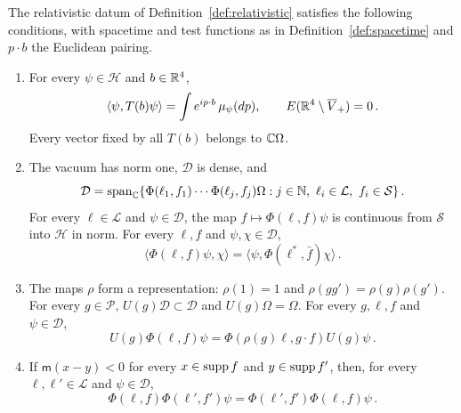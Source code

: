 \begin{definition}\label{def:wightman}
The relativistic datum of Definition~\ref{def:relativistic} satisfies the following conditions, with spacetime and test functions as in Definition~\ref{def:spacetime} and $p\cdot b$ the Euclidean pairing.
\begin{enumerate}[label=\textup{W\arabic*.},ref=W\arabic*,start=0]
\item\label{wightman:0} For every $\psi\in\mathcal H$ and $b\in\mathbb R^4$,
\begin{equation}\label{eq:spectrum}
\langle\psi,T(b)\psi\rangle=\int e^{ip\cdot b}\,\mu_\psi(dp),
\qquad E(\mathbb R^4\setminus\overline V_+)=0\,.
\end{equation}
Every vector fixed by all $T(b)$ belongs to $\mathbb C\Omega$.
\item\label{wightman:1} The vacuum has norm one, $\mathcal D$ is dense, and
\begin{equation}\label{eq:domain}
\mathcal D=\Span_{\C}\{\Phi(\ell_1,f_1)\cdots\Phi(\ell_j,f_j)\Omega:j\in\N,\ \ell_i\in\mathcal L,\ f_i\in\mathcal S\}\,.
\end{equation}
For every $\ell\in\mathcal L$ and $\psi\in\mathcal D$, the map $f\mapsto\Phi(\ell,f)\psi$ is continuous from $\mathcal S$ into $\mathcal H$ in norm.
For every $\ell,f$ and $\psi,\chi\in\mathcal D$,
\begin{equation}\label{eq:adjoint}
\langle\Phi(\ell,f)\psi,\chi\rangle=\langle\psi,\Phi(\ell^*,\bar f)\chi\rangle\,.
\end{equation}
\item\label{wightman:2} The maps $\rho$ form a representation: $\rho(1)=1$ and $\rho(gg')=\rho(g)\rho(g')$.
For every $g\in\mathcal P$, $U(g)\mathcal D\subset\mathcal D$ and $U(g)\Omega=\Omega$.
For every $g,\ell,f$ and $\psi\in\mathcal D$,
\begin{equation}\label{eq:covariance}
U(g)\Phi(\ell,f)\psi=\Phi(\rho(g)\ell,g\cdot f)U(g)\psi\,.
\end{equation}
\item\label{wightman:3} If $\mathsf m(x-y)<0$ for every $x\in\operatorname{supp} f$ and $y\in\operatorname{supp} f'$, then, for every $\ell,\ell'\in\mathcal L$ and $\psi\in\mathcal D$,
\begin{equation}\label{eq:locality}
\Phi(\ell,f)\Phi(\ell',f')\psi=\Phi(\ell',f')\Phi(\ell,f)\psi\,.
\end{equation}
\end{enumerate}
\end{definition}


